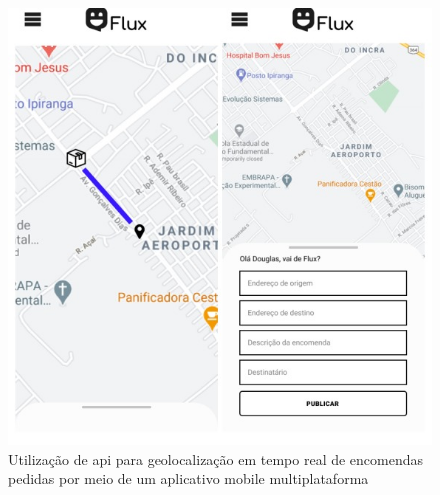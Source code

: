 \begin{figure}[h!]
\centering
\caption{Utilização de api para geolocalização em tempo real de encomendas pedidas por meio de um aplicativo mobile multiplataforma}
\label{fig:Oliveira12022}
\includegraphics[scale=0.6]{Illustrations/Oliveira12002.jpg}
\end{figure}